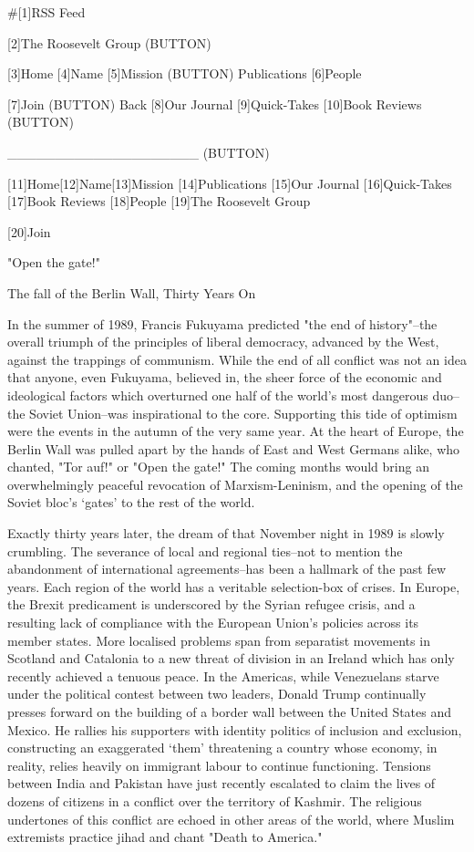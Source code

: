   #[1]RSS Feed

   [2]The Roosevelt Group
   (BUTTON)

   [3]Home [4]Name [5]Mission (BUTTON) Publications [6]People

   [7]Join
   (BUTTON) Back [8]Our Journal [9]Quick-Takes [10]Book Reviews
   (BUTTON)

   ____________________ (BUTTON)

   [11]Home[12]Name[13]Mission [14]Publications [15]Our Journal
   [16]Quick-Takes [17]Book Reviews [18]People
   [19]The Roosevelt Group

   [20]Join

"Open the gate!"


The fall of the Berlin Wall, Thirty Years On

   In the summer of 1989, Francis Fukuyama predicted "the end of
   history"--the overall triumph of the principles of liberal democracy,
   advanced by the West, against the trappings of communism. While the end
   of all conflict was not an idea that anyone, even Fukuyama, believed
   in, the sheer force of the economic and ideological factors which
   overturned one half of the world's most dangerous duo--the Soviet
   Union--was inspirational to the core. Supporting this tide of optimism
   were the events in the autumn of the very same year. At the heart of
   Europe, the Berlin Wall was pulled apart by the hands of East and West
   Germans alike, who chanted, "Tor auf!" or "Open the gate!" The coming
   months would bring an overwhelmingly peaceful revocation of
   Marxism-Leninism, and the opening of the Soviet bloc's `gates' to the
   rest of the world.

   Exactly thirty years later, the dream of that November night in 1989 is
   slowly crumbling. The severance of local and regional ties--not to
   mention the abandonment of international agreements--has been a
   hallmark of the past few years. Each region of the world has a
   veritable selection-box of crises. In Europe, the Brexit predicament is
   underscored by the Syrian refugee crisis, and a resulting lack of
   compliance with the European Union's policies across its member states.
   More localised problems span from separatist movements in Scotland and
   Catalonia to a new threat of division in an Ireland which has only
   recently achieved a tenuous peace. In the Americas, while Venezuelans
   starve under the political contest between two leaders, Donald Trump
   continually presses forward on the building of a border wall between
   the United States and Mexico. He rallies his supporters with identity
   politics of inclusion and exclusion, constructing an exaggerated `them'
   threatening a country whose economy, in reality, relies heavily on
   immigrant labour to continue functioning. Tensions between India and
   Pakistan have just recently escalated to claim the lives of dozens of
   citizens in a conflict over the territory of Kashmir. The religious
   undertones of this conflict are echoed in other areas of the world,
   where Muslim extremists practice jihad and chant "Death to America."

